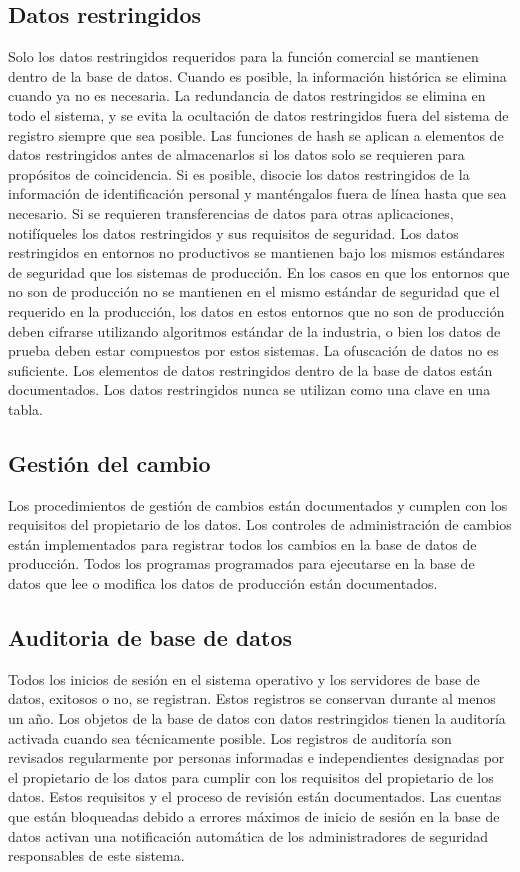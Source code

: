 \subsection{Datos restringidos}
Solo los datos restringidos requeridos para la función comercial se mantienen dentro de la base de datos. Cuando es posible, la información histórica se elimina cuando ya no es necesaria.
La redundancia de datos restringidos se elimina en todo el sistema, y ​​se evita la ocultación de datos restringidos fuera del sistema de registro siempre que sea posible. Las funciones de hash se aplican a elementos de datos restringidos antes de almacenarlos si los datos solo se requieren para propósitos de coincidencia. Si es posible, disocie los datos restringidos de la información de identificación personal y manténgalos fuera de línea hasta que sea necesario. Si se requieren transferencias de datos para otras aplicaciones, notifíqueles los datos restringidos y sus requisitos de seguridad.
Los datos restringidos en entornos no productivos se mantienen bajo los mismos estándares de seguridad que los sistemas de producción. En los casos en que los entornos que no son de producción no se mantienen en el mismo estándar de seguridad que el requerido en la producción, los datos en estos entornos que no son de producción deben cifrarse utilizando algoritmos estándar de la industria, o bien los datos de prueba deben estar compuestos por estos sistemas. La ofuscación de datos no es suficiente.
Los elementos de datos restringidos dentro de la base de datos están documentados.
Los datos restringidos nunca se utilizan como una clave en una tabla.

\subsection{Gestión del cambio}
Los procedimientos de gestión de cambios están documentados y cumplen con los requisitos del propietario de los datos.           
Los controles de administración de cambios están implementados para registrar todos los cambios en la base de datos de producción.           
Todos los programas programados para ejecutarse en la base de datos que lee o modifica los datos de producción están documentados.      

\subsection{Auditoria de base de datos}
Todos los inicios de sesión en el sistema operativo y los servidores de base de datos, exitosos o no, se registran. Estos registros se conservan durante al menos un año.
Los objetos de la base de datos con datos restringidos tienen la auditoría activada cuando sea técnicamente posible.           
Los registros de auditoría son revisados ​​regularmente por personas informadas e independientes designadas por el propietario de los datos para cumplir con los requisitos del propietario de los datos. Estos requisitos y el proceso de revisión están documentados.           
Las cuentas que están bloqueadas debido a errores máximos de inicio de sesión en la base de datos activan una notificación automática de los administradores de seguridad responsables de este sistema.

